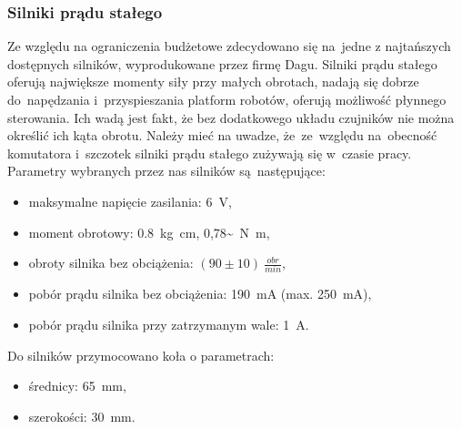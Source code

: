 \documentclass[11pt]{article}
\begin{document}
\subsubsection{Silniki prądu stałego}
Ze względu na ograniczenia budżetowe zdecydowano się na~jedne z najtańszych dostępnych silników, wyprodukowane przez firmę Dagu.
Silniki prądu stałego oferują największe momenty siły przy małych obrotach, nadają się dobrze do~napędzania i~przyspieszania platform robotów, oferują możliwość płynnego sterowania.
Ich wadą jest fakt, że bez dodatkowego układu czujników nie można określić ich kąta obrotu.
Należy mieć na uwadze, że~ze~względu na~obecność komutatora i~szczotek silniki prądu stałego zużywają się w~czasie pracy.
Parametry wybranych przez nas silników są~następujące:
\begin{itemize}
	\item maksymalne napięcie zasilania: 6~\si{\volt},
	\item moment obrotowy: \SI[inter-unit-product =\ensuremath{\cdot}]{0,8}{\kilogram\centi\meter}, \SI[inter-unit-product =\ensuremath{\cdot}]{0,78~}{\newton\meter},
	\item obroty silnika bez obciążenia: $ (90 \pm 10) \ \frac{obr}{min} $,
	\item pobór prądu silnika bez obciążenia: 190~\si{\milli\ampere} (max. 250~\si{\milli\ampere}),
	\item pobór prądu silnika przy zatrzymanym wale: 1~\si{\ampere}.
\end{itemize}
Do silników przymocowano koła o parametrach:
\begin{itemize}
	\item średnicy: 65~\si{\milli\meter},
	\item szerokości: 30~\si{\milli\meter}.
\end{itemize}
\end{document}
